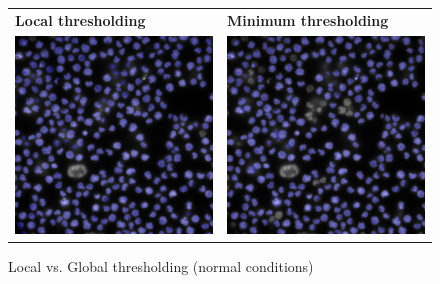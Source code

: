 \begin{figure}[H]
    \centering
    \centering
        \begin{tabularx}{\textwidth}{YY}
            \textbf{Local thresholding} &
            \textbf{Minimum thresholding} \\
            \includegraphics{bilder/difficult-lightning/normal_local.png} & \includegraphics{bilder/difficult-lightning/normal_min.png}
        \end{tabularx}
    \caption{Local vs. Global thresholding (normal conditions)}
    \label{fig:local-vs-global-normal}
\end{figure}

